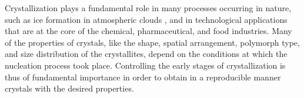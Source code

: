 \documentclass[preprint,amsmath,amssymb,superscriptaddress]{revtex4-1}
\begin{document}

\maketitle


Crystallization plays a fundamental role in many processes occurring in nature, such as ice formation in atmospheric clouds \cite{glickman2000glossary,morrison2012resilience}, and in technological applications
that are at the core of the chemical, pharmaceutical, and food industries.
Many of the properties of crystals, like the shape, spatial arrangement, polymorph type, and size distribution of the crystallites, depend on the conditions at which
the nucleation process took place. Controlling the early stages of crystallization is thus of fundamental importance in order to
obtain in a reproducible manner crystals with the desired properties. 
\end{document}
